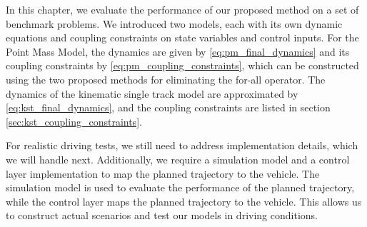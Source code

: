 In this chapter, we evaluate the performance of our proposed method on a set of benchmark problems.
We introduced two models, each with its own dynamic equations and coupling constraints on state variables and control inputs.
For the Point Mass Model, the dynamics are given by \ref{eq:pm_final_dynamics} and its coupling constraints by \ref{eq:pm_coupling_constraints},
which can be constructed using the two proposed methods for eliminating the for-all operator.
The dynamics of the kinematic single track model are approximated by \ref{eq:kst_final_dynamics}, and the coupling constraints are listed in section
\ref{sec:kst_coupling_constraints}.

For realistic driving tests, we still need to address implementation details, which we will handle next.
Additionally, we require a simulation model and a control layer implementation to map the planned trajectory to the vehicle.
The simulation model is used to evaluate the performance of the planned trajectory, while the control layer maps the planned trajectory to the
vehicle.
This allows us to construct actual scenarios and test our models in driving conditions.
